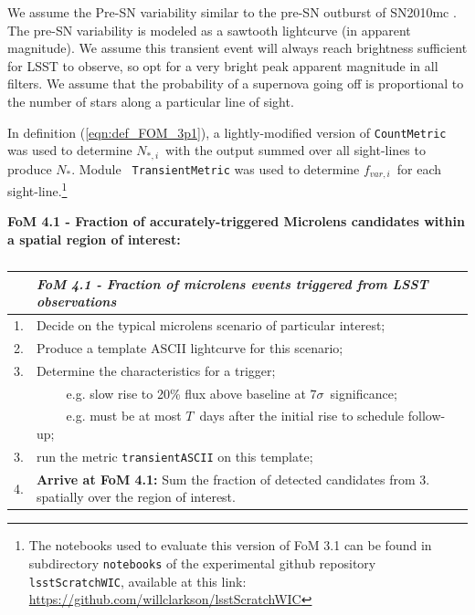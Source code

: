 We assume the Pre-SN variability similar to the pre-SN outburst of
SN2010mc \citep{2013Natur.494...65O}. The pre-SN variability is
modeled as a sawtooth lightcurve (in apparent magnitude). We assume
this transient event will always reach brightness sufficient for LSST
to observe, so opt for a very bright peak apparent magnitude in all
filters. We assume that the probability of a supernova going off is
proportional to the number of stars along a particular line of
sight.

In definition (\ref{eqn:def_FOM_3p1}), a lightly-modified version of
{\tt CountMetric} was used to determine $N_{\ast, i}$~with the output
summed over all sight-lines to produce $N_{\ast}$. Module {\tt
  TransientMetric} was used to determine $f_{var, i}$~for each
sight-line.\footnote{The notebooks used to evaluate this version of
  FoM 3.1 can be found in subdirectory {\tt notebooks} of the
  experimental github repository {\tt lsstScratchWIC}, available at
  this link: \url{https://github.com/willclarkson/lsstScratchWIC}}


{\bf FoM 4.1 - Fraction of accurately-triggered Microlens candidates
  within a spatial region of interest:} 

\begin{table}[h]
  \small
  \begin{tabular}{c p{12cm}}
    & {\it FoM 4.1 - Fraction of microlens events triggered from LSST observations} \\
    \hline
  1. & Decide on the typical microlens scenario of particular interest; \\
  2. & Produce a template ASCII lightcurve for this scenario; \\
  3. & Determine the characteristics for a trigger; \\
     & ~~~~ e.g. slow rise to 20\% flux above baseline at 7$\sigma$~significance;\\
     & ~~~~ e.g. must be at most $T$~days after the initial rise to schedule follow-up; \\
  3. & run the metric {\tt transientASCII} on this template; \\
  4. & {\bf Arrive at FoM 4.1:} Sum the fraction of detected candidates from 3. spatially over the region of interest.\\
\hline
    \end{tabular}
 \caption{}
  \label{table:pseudoFOM_4p1}
\end{table}

